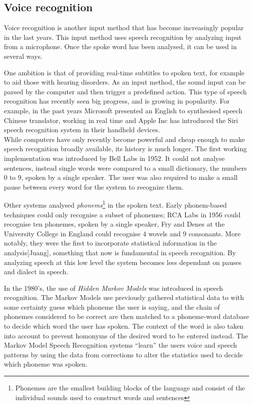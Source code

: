 \subsection{Voice recognition}

Voice recognition is another input method that has become increasingly popular in the last years. This input method uses speech recognition by analyzing input from a microphone. Once the spoke word has been analysed, it can be used in several ways.

One ambition is that of providing real-time subtitles to spoken text, for example to aid those with hearing disorders. As an input method, the sound input can be parsed by the computer and then trigger a predefined action. This type of speech recognition has recently seen big progress, and is growing in popularity. For example, in the past years Microsoft presented an English to synthesised speech Chinese translator, working in real time and Apple Inc has introduced the Siri speech recognition system in their handheld devices.\\

While computers have only recently become powerful and cheap enough to make speech recognition broadly available, its history is much longer. The first working implementation was introduced by Bell Labs in 1952\cite{Davis52}. It could not analyse sentences, instead single words were compared to a small dictionary, the numbers 0 to 9, spoken by a single speaker. The user was also required to make a small pause between every word for the system to recognize them.

Other systems analysed \emph{phonems}\footnote{Phonemes are the smallest building blocks of the language and consist of the individual sounds used to construct words and sentences} in the spoken text. Early phonem-based techniques could only recognise a subset of phonemes; RCA Labs in 1956 could recognise ten phonemes, spoken by a single speaker, Fry and Denes at the University College in England could recognise 4 wovels and 9 consonants. More notably, they were the first to incorporate statistical information in the analysis[Juang], something that now is fundamental in speech recognition. By analyzing speech at this low level the system becomes less dependant on pauses and dialect in speech.

In the 1980's, the use of \emph{Hidden Markov Models} was introduced in speech recognition\cite{rabiner1986introduction}. The Markov Models use previously gathered statistical data to with some certainty guess which phoneme the user is saying, and the chain of phonemes considered to be correct are then matched to a phoneme-word database to decide which word the user has spoken. The context of the word is also taken into account to prevent homonyms of the desired word to be entered instead. The Markov Model Speech Recognition systems ``learn'' the users voice and speech patterns by using the data from corrections to alter the statistics used to decide which phoneme was spoken.

